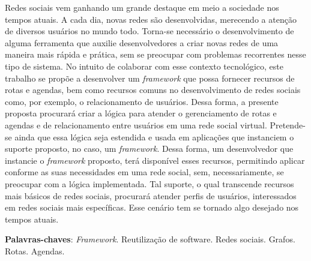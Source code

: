 \begin{resumo}

Redes sociais vem ganhando um grande destaque em meio a sociedade nos tempos atuais. A cada dia, novas redes são desenvolvidas, merecendo a atenção de diversos usuários no mundo todo. Torna-se necessário o desenvolvimento de alguma ferramenta que auxilie desenvolvedores a criar novas redes de uma maneira mais rápida e prática, sem se preocupar com problemas recorrentes nesse tipo de sistema. No intuito de colaborar com esse contexto tecnológico, este trabalho se propõe a desenvolver um \textit{framework} que possa fornecer recursos de rotas e agendas, bem como recursos comuns no desenvolvimento de redes sociais como, por exemplo, o relacionamento de usuários. Dessa forma, a presente proposta procurará criar a lógica para atender o gerenciamento de rotas e agendas e de relacionamento entre usuários em uma rede social virtual. Pretende-se ainda que essa lógica seja estendida e usada em aplicações que instanciem o suporte proposto, no caso, um \textit{framework}. Dessa forma, um desenvolvedor que instancie o \textit{framework} proposto, terá disponível esses recursos, permitindo aplicar conforme as suas necessidades em uma rede social, sem, necessariamente, se preocupar com a lógica implementada. Tal suporte, o qual transcende recursos mais básicos de redes sociais, procurará atender perfis de usuários, interessados em redes sociais mais específicas. Esse cenário tem se tornado algo desejado nos tempos atuais.

 \vspace{\onelineskip}
    
 \noindent
 \textbf{Palavras-chaves}: \textit{Framework}. Reutilização de software. Redes sociais. Grafos. Rotas. Agendas.
\end{resumo}
